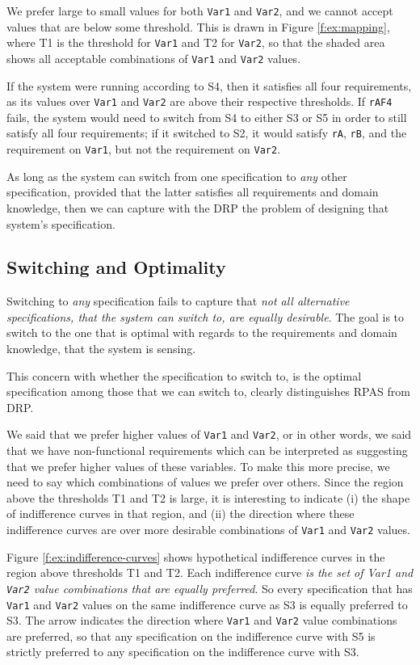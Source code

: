 \documentclass[graybox]{svmult}
\newcommand{\zi}[1]{\textit{#1}}
\newcommand{\xt}[1]{\texttt{#1}}
\newcommand{\req}[1]{\xt{#1}}
\newcommand{\RPAS}{RPAS}
\newcommand{\ZJRP}{DRP}
\begin{document}
We prefer large to small values for both \req{Var1} and \req{Var2}, and we cannot accept values that are below some threshold. This is drawn in Figure \ref{f:ex:mapping}, where T1 is the threshold for \req{Var1} and T2 for \req{Var2}, so that the shaded area shows all acceptable combinations of \req{Var1} and \req{Var2} values.

If the system were running according to S4, then it satisfies all four requirements, as its values over \req{Var1} and \req{Var2} are above their respective thresholds. If \req{rAF4} fails, the system would need to switch from S4 to either S3 or S5 in order to still satisfy all four requirements; if it switched to S2, it would satisfy \req{rA}, \req{rB}, and the requirement on \req{Var1}, but not the requirement on \req{Var2}.

As long as the system can switch from one specification to \zi{any} other specification, provided that the latter satisfies all requirements and domain knowledge, then we can capture with the \ZJRP{} the problem of designing that system's specification. 


%
\subsection{Switching and Optimality}\label{s:optimality-criteria-importance:switching-and-optimality}
Switching to \zi{any} specification fails to capture that \zi{not all alternative specifications, that the system can switch to, are equally desirable}. The goal is to switch to the one that is optimal with regards to the requirements and domain knowledge, that the system is sensing.

This concern with whether the specification to switch to, is the optimal specification among those that we can switch to, clearly distinguishes \RPAS{} from \ZJRP.

We said that we prefer higher values of \req{Var1} and \req{Var2}, or in other words, we said that we have non-functional requirements which can be interpreted as suggesting that we prefer higher values of these variables. To make this more precise, we need to say which combinations of values we prefer over others. Since the region above the thresholds T1 and T2 is large, it is interesting to indicate (i) the shape of indifference curves in that region, and (ii) the direction where these indifference curves are over more desirable combinations of \req{Var1} and \req{Var2} values. 

Figure \ref{f:ex:indifference-curves} shows hypothetical indifference curves in the region above thresholds T1 and T2. Each indifference curve \zi{is the set of Var1 and \req{Var2} value combinations that are equally preferred}. So every specification that has \req{Var1} and \req{Var2} values on the same indifference curve as S3 is equally preferred to S3. The arrow indicates the direction where \req{Var1} and \req{Var2} value combinations are preferred, so that any specification on the indifference curve with S5 is strictly preferred to any specification on the indifference curve with S3.
\end{document}
